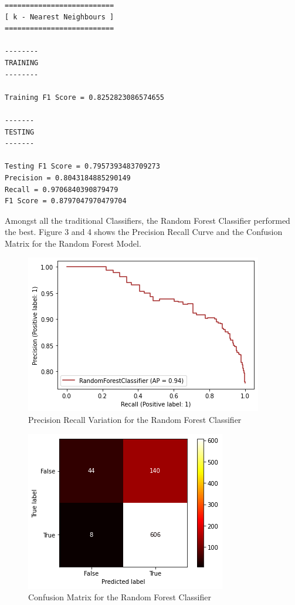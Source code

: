 \documentclass[conference]{IEEEtran}
\begin{document}
\begin{verbatim}
==========================
[ k - Nearest Neighbours ]
==========================

--------
TRAINING
--------

Training F1 Score = 0.8252823086574655

-------
TESTING
-------

Testing F1 Score = 0.7957393483709273
Precision = 0.8043184885290149
Recall = 0.9706840390879479
F1 Score = 0.8797047970479704

\end{verbatim}
Amongst all the traditional Classifiers, the Random Forest Classifier performed the best. Figure 3 and 4 shows the Precision Recall Curve and the Confusion Matrix for the Random Forest Model.
\begin{figure}[htbp]
\label{fig3}
\centerline{\includegraphics[width = \linewidth]{3}}
\caption{Precision Recall Variation for the Random Forest Classifier}
\end{figure}
\begin{figure}[htbp]
\label{fig4}
\centerline{\includegraphics[width = \linewidth]{4}}
\caption{Confusion Matrix for the Random Forest Classifier}
\end{figure}
\end{document}
